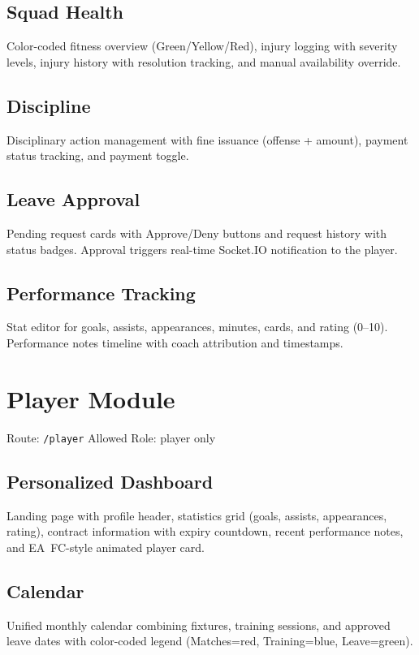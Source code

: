 \documentclass[12pt,a4paper,oneside]{report}
\begin{document}
\subsection{Squad Health}
Color-coded fitness overview (Green/Yellow/Red), injury logging with severity levels, injury history with resolution tracking, and manual availability override.

\subsection{Discipline}
Disciplinary action management with fine issuance (offense + amount), payment status tracking, and payment toggle.

\subsection{Leave Approval}
Pending request cards with Approve/Deny buttons and request history with status badges. Approval triggers real-time Socket.IO notification to the player.

\subsection{Performance Tracking}
Stat editor for goals, assists, appearances, minutes, cards, and rating (0--10). Performance notes timeline with coach attribution and timestamps.

\section{Player Module}

Route: \texttt{/player} \quad Allowed Role: player only

\subsection{Personalized Dashboard}
Landing page with profile header, statistics grid (goals, assists, appearances, rating), contract information with expiry countdown, recent performance notes, and EA~FC-style animated player card.

\subsection{Calendar}
Unified monthly calendar combining fixtures, training sessions, and approved leave dates with color-coded legend (Matches=red, Training=blue, Leave=green).
\end{document}

